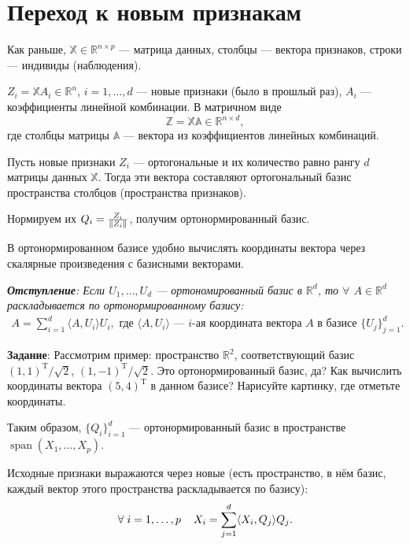 \documentclass[specialist, 12pt,
subf, %
href, colorlinks=true,
substylefile = spbu.rtx,
]{disser}
\DeclareMathOperator{\spn}{span}
\begin{document}
	
\section{Переход к новым признакам}

Как раньше, $\mathbb{X} \in \mathbb{R}^{n \times p}$ --- матрица данных, столбцы --- вектора признаков, строки --- индивиды (наблюдения).

 $Z_i = \mathbb{X} A_i \in \mathbb{R}^n$, $i=1,\ldots,d$ --- новые признаки (было в прошлый раз), $A_i$ --- коэффициенты линейной комбинации. В матричном виде $$\mathbb{Z} = \mathbb{X} \mathbb{A} \in \mathbb{R}^{n \times d},$$ где столбцы матрицы $\mathbb{A}$ --- вектора из коэффициентов линейных комбинаций.

Пусть новые признаки $Z_i$ --- ортогональные и их количество равно рангу $d$ матрицы данных $\mathbb{X}$. Тогда эти вектора составляют ортогональный базис пространства столбцов (пространства признаков).

Нормируем их $Q_i = \frac{Z_i}{\Arrowvert Z_i\Arrowvert}$, получим ортонормированный базис. 

В ортонормированном базисе удобно вычислять координаты вектора через скалярные произведения с базисными векторами.

{\it\small
\textbf{Отступление}:
Если $U_1, \ldots, U_d$ --- ортономированный базис в $\mathbb{R}^d$, то $\forall$ $A \in \mathbb{R}^d$ раскладывается по ортонормированному базису:
\begin{gather*}
A = \sum\limits_{i = 1}^d \langle A, U_i \rangle U_i, \text{ где $\langle A, U_i\rangle$ --- $i$-ая координата вектора $A$ в базисе $\{U_j\}_{j = 1}^d$.}
\end{gather*}

\textbf{Задание}:
 {Рассмотрим пример: пространство $\mathbb{R}^2$, соответствующий базис $(1,1)^{\mathrm{T}}/\sqrt{2}$, $(1,-1)^{\mathrm{T}}/\sqrt{2}$. Это ортонормированный базис, да? Как вычислить координаты вектора $(5, 4)^{\mathrm{T}}$ в данном базисе? Нарисуйте картинку, где отметьте координаты.
}
}

\medskip
Таким образом, $\{Q_i\}_{i=1}^d$ --- ортонормированный базис в пространстве $\spn(X_1, \ldots, X_p)$.


	Исходные признаки выражаются через новые (есть пространство, в нём базис, каждый вектор этого пространства раскладывается по базису):
	\begin{gather}\label{1}
	\forall \hspace{0.1 cm} i = 1,\ldots,p \hspace{0.4 cm} X_i = \sum\limits_{j = 1}^d \langle X_i, Q_j\rangle Q_j.
	\end{gather}
\end{document}
